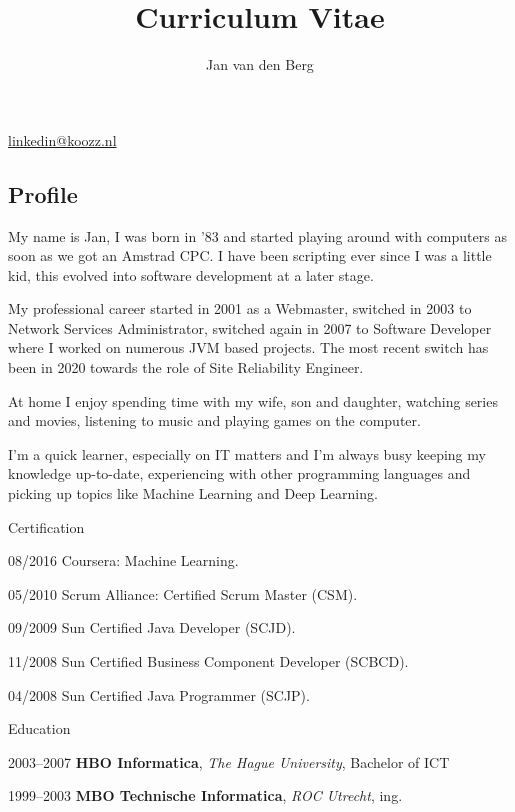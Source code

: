 \documentclass[11pt,a4paper]{article}
\title{Curriculum Vitae}
\author{Jan van den Berg}
\makeatletter
\renewcommand{\maketitle}{
	\begin{center}
	{\huge\bfseries\theauthor}

	\vspace{.25em}
	\href{mailto:linkedin@koozz.nl}{linkedin@koozz.nl}
	\end{center}
}
\makeatother
\begin{document}
\maketitle
\begin{cv}{}
	\section{Profile}
	My name is Jan, I was born in '83 and started playing around with computers
	as soon as we got an Amstrad CPC. I have been scripting ever since I was a
	little kid, this evolved into software development at a later stage.

	My professional career started in 2001 as a Webmaster, switched in 2003 to
	Network Services Administrator, switched again in 2007 to Software Developer
	where I worked on numerous JVM based projects. The most recent switch has
	been in 2020 towards the role of Site Reliability Engineer.
	
	At home I enjoy spending time with my wife, son and daughter, watching series
	and movies, listening to music and playing games on the computer.

	I'm a	quick learner, especially on IT matters and I'm always busy keeping my
	knowledge up-to-date, experiencing with other programming languages and
	picking up topics like Machine Learning and Deep Learning.

	\vspace{.5em}

	\begin{cvlist}{Certification}
		\item[08/2016] Coursera: Machine Learning.
		\item[05/2010] Scrum Alliance: Certified Scrum Master (CSM).
		\item[09/2009] Sun Certified Java Developer (SCJD).
		\item[11/2008] Sun Certified Business Component Developer (SCBCD).
		\item[04/2008] Sun Certified Java Programmer (SCJP).
	\end{cvlist}

	\vspace{.5em}

	\begin{cvlist}{Education}
		\item[2003--2007] \textbf{HBO Informatica}, \textit{The Hague University},
		Bachelor of ICT
		\item[1999--2003] \textbf{MBO Technische Informatica}, \textit{ROC
		Utrecht}, ing.
	\end{cvlist}


\end{cv}
\end{document}
